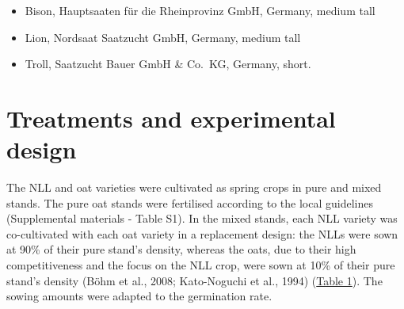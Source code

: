 \documentclass[
  british,
  a4paper,
  DIV=11,
  numbers=noendperiod]{scrreprt}
\providecommand{\tightlist}{%
  \setlength{\itemsep}{0pt}\setlength{\parskip}{0pt}}
\begin{document}
\begin{itemize}
\tightlist
\item
  Bison, Hauptsaaten für die Rheinprovinz GmbH, Germany, medium tall
\item
  Lion, Nordsaat Saatzucht GmbH, Germany, medium tall
\item
  Troll, Saatzucht Bauer GmbH \& Co.~KG, Germany, short.
\end{itemize}

\section{Treatments and experimental
design}\label{treatments-and-experimental-design}

The NLL and oat varieties were cultivated as spring crops in pure and
mixed stands. The pure oat stands were fertilised according to the local
guidelines (Supplemental materials - Table S1). In the mixed stands,
each NLL variety was co-cultivated with each oat variety in a
replacement design: the NLLs were sown at 90\% of their pure stand's
density, whereas the oats, due to their high competitiveness and the
focus on the NLL crop, were sown at 10\% of their pure stand's density
(Böhm et al., 2008; Kato-Noguchi et al., 1994) (\hyperref[tbl_trt]{Table
1}). The sowing amounts were adapted to the germination rate.

\begin{table}

\caption{\label{tbl-trt}}


\end{table}%
\end{document}
